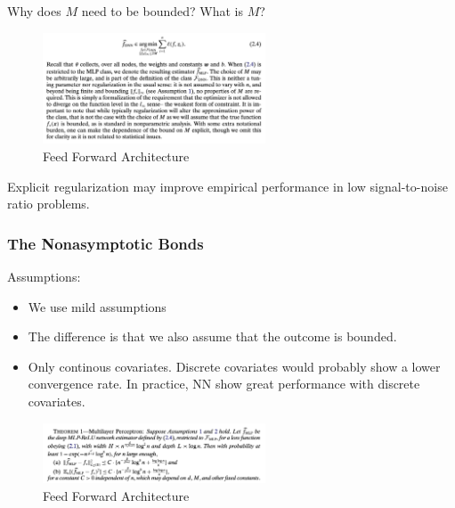 \documentclass{article}
\begin{document}
Why does $M$ need to be bounded? What is $M$?

\begin{figure}[H]
  \centering
  \includegraphics[width=250px]{draft-photos/dnn-for-estimation/dnn_m_condition.png}
  \caption{Feed Forward Architecture}
  \label{fig:dnn_m_condition}
\end{figure}

Explicit regularization may improve empirical performance in low signal-to-noise ratio problems.

\subsubsection{The Nonasymptotic Bonds}
Assumptions:
\begin{itemize}
  \item We use mild assumptions
  \item The difference is that we also assume that the outcome is bounded.
  \item Only continous covariates. Discrete covariates would probably show a lower convergence rate. In practice, NN show great performance with discrete covariates.
\end{itemize}

\begin{figure}[H]
  \centering
  \includegraphics[width=250px]{draft-photos/dnn-for-estimation/dnn_theorem_1.png}
  \caption{Feed Forward Architecture}
  \label{fig:dnn_theorem_1}
\end{figure}
\end{document}
